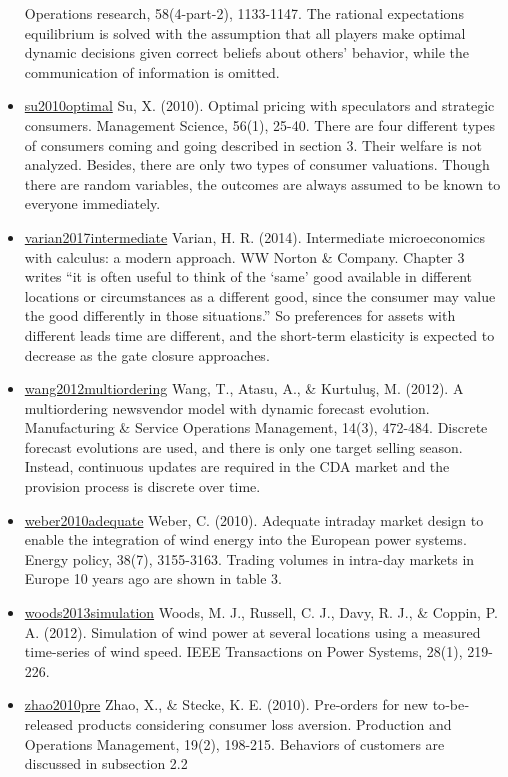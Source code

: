 \documentclass[letterpaper,8pt,twocolumn,twoside,]{pinp}
\begin{document}
\begin{itemize}
  Operations research, 58(4-part-2), 1133-1147. The rational
  expectations equilibrium is solved with the assumption that all
  players make optimal dynamic decisions given correct beliefs about
  others' behavior, while the communication of information is omitted.
\item
  \href{https://pubsonline.informs.org/doi/10.1287/mnsc.1090.1075}{su2010optimal}
  Su, X. (2010). Optimal pricing with speculators and strategic
  consumers. Management Science, 56(1), 25-40. There are four different
  types of consumers coming and going described in section 3. Their
  welfare is not analyzed. Besides, there are only two types of consumer
  valuations. Though there are random variables, the outcomes are always
  assumed to be known to everyone immediately.
\item
  \href{https://wwnorton.com/books/9780393689983/about-the-book/product-details}{varian2017intermediate}
  Varian, H. R. (2014). Intermediate microeconomics with calculus: a
  modern approach. WW Norton \& Company. Chapter 3 writes ``it is often
  useful to think of the `same' good available in different locations or
  circumstances as a different good, since the consumer may value the
  good differently in those situations.'' So preferences for assets with
  different leads time are different, and the short-term elasticity is
  expected to decrease as the gate closure approaches.
\item
  \href{https://pubsonline.informs.org/doi/pdf/10.1287/msom.1120.0387}{wang2012multiordering}
  Wang, T., Atasu, A., \& Kurtuluş, M. (2012). A multiordering
  newsvendor model with dynamic forecast evolution. Manufacturing \&
  Service Operations Management, 14(3), 472-484. Discrete forecast
  evolutions are used, and there is only one target selling season.
  Instead, continuous updates are required in the CDA market and the
  provision process is discrete over time.
\item
  \href{https://www.sciencedirect.com/science/article/pii/S0301421509005564}{weber2010adequate}
  Weber, C. (2010). Adequate intraday market design to enable the
  integration of wind energy into the European power systems. Energy
  policy, 38(7), 3155-3163. Trading volumes in intra-day markets in
  Europe 10 years ago are shown in table 3.
\item
  \href{https://ieeexplore.ieee.org/document/6262462}{woods2013simulation}
  Woods, M. J., Russell, C. J., Davy, R. J., \& Coppin, P. A. (2012).
  Simulation of wind power at several locations using a measured
  time-series of wind speed. IEEE Transactions on Power Systems, 28(1),
  219-226.
\item
  \href{https://onlinelibrary.wiley.com/doi/abs/10.1111/j.1937-5956.2009.01092.x?casa_token=OFXPwPdWLU0AAAAA:5l-61h0Fl19UbgKSXoJEyS85zUGGyqK8-G6A4TImpG4StMJtsJKjokbC6r4jwvezceSVpybsbpqsZ8A}{zhao2010pre}
  Zhao, X., \& Stecke, K. E. (2010). Pre‐orders for new to‐be‐released
  products considering consumer loss aversion. Production and Operations
  Management, 19(2), 198-215. Behaviors of customers are discussed in
  subsection 2.2
\end{itemize}

\end{document}
